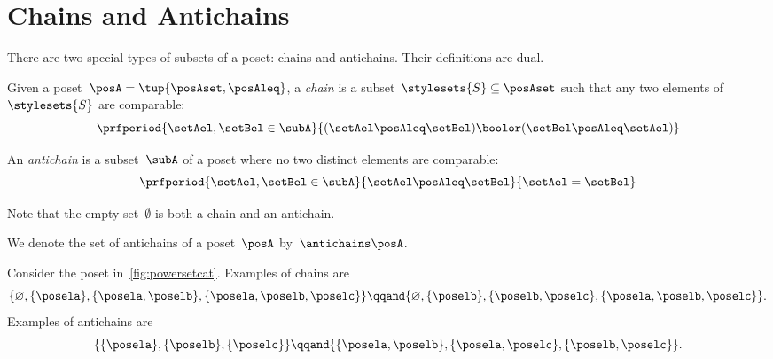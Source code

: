 
\section{Chains and Antichains}
\label{sec:chains-antichains}

There are two special types of subsets of a poset: chains and antichains.
Their definitions are dual.

\begin{definition}
	\label{def:chain}
	Given a poset~$\posA = \tup{\posAset, \posAleq}$, a \emph{chain} is a subset~$\stylesets{S} \subseteq \posAset$ such that any two elements of~$\stylesets{S}$ are comparable:
	\begin{equation}
		\prfperiod{
			\setAel,\setBel \in \subA
		}{
			(\setAel \posAleq  \setBel) \boolor (\setBel \posAleq  \setAel)
		}
	\end{equation}
\end{definition}

\begin{definition}
	\label{def:antichain}
	An \emph{antichain} is a subset~$\subA$ of a poset where no two distinct elements are comparable:
	\begin{equation}
		\prfperiod{
			\setAel,\setBel \in \subA
		}{
			\setAel \posAleq \setBel
		}{
			\setAel = \setBel
		}
	\end{equation}
\end{definition}
\begin{remark}
	Note that the empty set~$\emptyset$ is both a chain and an antichain.
\end{remark}

We denote the set of antichains of a poset~$\posA$ by~$\antichains\posA$.

\begin{example}
	Consider the poset in~\cref{fig:powersetcat}.
	Examples of chains are
	\begin{equation}
		\{\varnothing,\{\posela\},\{\posela,\poselb\},\{\posela,\poselb,\poselc\}\}
		\qqand
		\{\varnothing,\{\poselb\},\{\poselb,\poselc\},\{\posela,\poselb,\poselc\}\}.
	\end{equation}
	Examples of antichains are
	\begin{equation}
		\{\{\posela\},\{\poselb\},\{\poselc\}\}
		\qqand
		\{ \{\posela,\poselb\},\{\posela,\poselc\}, \{\poselb,\poselc\}\}.
	\end{equation}

\end{example}

